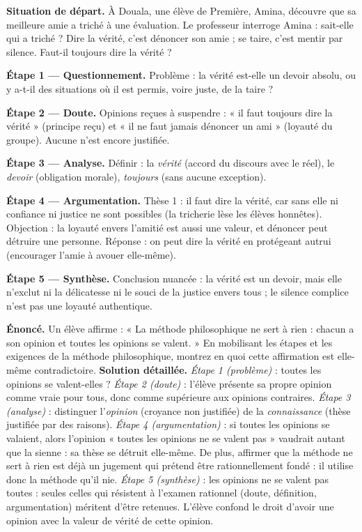 \documentclass[11pt]{article}
\begin{document}
\begin{experience}
\textbf{Situation de départ.} À Douala, une élève de Première, Amina, découvre que sa meilleure amie a triché à une évaluation. Le professeur interroge Amina : sait-elle qui a triché ? Dire la vérité, c'est dénoncer son amie ; se taire, c'est mentir par silence. Faut-il toujours dire la vérité ?\par
\textbf{Étape 1 — Questionnement.} Problème : la vérité est-elle un devoir absolu, ou y a-t-il des situations où il est permis, voire juste, de la taire ?\par
\textbf{Étape 2 — Doute.} Opinions reçues à suspendre : « il faut toujours dire la vérité » (principe reçu) et « il ne faut jamais dénoncer un ami » (loyauté du groupe). Aucune n'est encore justifiée.\par
\textbf{Étape 3 — Analyse.} Définir : la \emph{vérité} (accord du discours avec le réel), le \emph{devoir} (obligation morale), \emph{toujours} (sans aucune exception).\par
\textbf{Étape 4 — Argumentation.} Thèse 1 : il faut dire la vérité, car sans elle ni confiance ni justice ne sont possibles (la tricherie lèse les élèves honnêtes). Objection : la loyauté envers l'amitié est aussi une valeur, et dénoncer peut détruire une personne. Réponse : on peut dire la vérité en protégeant autrui (encourager l'amie à avouer elle-même).\par
\textbf{Étape 5 — Synthèse.} Conclusion nuancée : la vérité est un devoir, mais elle n'exclut ni la délicatesse ni le souci de la justice envers tous ; le silence complice n'est pas une loyauté authentique.
\end{experience}

\begin{exoresolu}
\textbf{Énoncé.} Un élève affirme : « La méthode philosophique ne sert à rien : chacun a son opinion et toutes les opinions se valent. » En mobilisant les étapes et les exigences de la méthode philosophique, montrez en quoi cette affirmation est elle-même contradictoire.
\tcblower
\textbf{Solution détaillée.} \emph{Étape 1 (problème)} : toutes les opinions se valent-elles ? \emph{Étape 2 (doute)} : l'élève présente sa propre opinion comme vraie pour tous, donc comme supérieure aux opinions contraires. \emph{Étape 3 (analyse)} : distinguer l'\emph{opinion} (croyance non justifiée) de la \emph{connaissance} (thèse justifiée par des raisons). \emph{Étape 4 (argumentation)} : si toutes les opinions se valaient, alors l'opinion « toutes les opinions ne se valent pas » vaudrait autant que la sienne : sa thèse se détruit elle-même. De plus, affirmer que la méthode ne sert à rien est déjà un jugement qui prétend être rationnellement fondé : il utilise donc la méthode qu'il nie. \emph{Étape 5 (synthèse)} : les opinions ne se valent pas toutes : seules celles qui résistent à l'examen rationnel (doute, définition, argumentation) méritent d'être retenues. L'élève confond le droit d'avoir une opinion avec la valeur de vérité de cette opinion.
\end{exoresolu}
\end{document}
